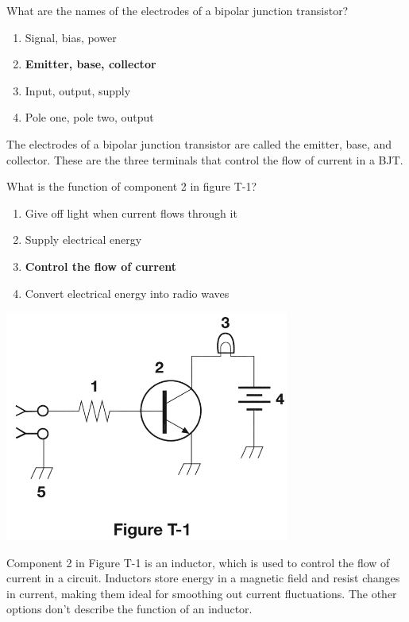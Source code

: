 \begin{tcolorbox}[colback=gray!10!white,colframe=black!75!black,title={T6B12}]
    What are the names of the electrodes of a bipolar junction transistor?
    \begin{enumerate}[label=\Alph*),noitemsep]
        \item Signal, bias, power
        \item \textbf{Emitter, base, collector}
        \item Input, output, supply
        \item Pole one, pole two, output
    \end{enumerate}
\end{tcolorbox}
The electrodes of a bipolar junction transistor are called the emitter, base, and collector. These are the three terminals that control the flow of current in a BJT.

\begin{tcolorbox}[
    colback=gray!10!white,
    colframe=black!75!black,
    title={T6D10},
    sidebyside,
    sidebyside align=top,
    lefthand width=0.45\textwidth
]
What is the function of component 2 in figure T-1?
\begin{enumerate}[label=\Alph*),noitemsep]
    \item Give off light when current flows through it
    \item Supply electrical energy
    \item \textbf{Control the flow of current}
    \item Convert electrical energy into radio waves
\end{enumerate}
\tcblower
\includegraphics[width=0.7\textwidth]{tech/images/t1.png}
\end{tcolorbox}
Component 2 in Figure T-1 is an inductor, which is used to control the flow of current in a circuit. Inductors store energy in a magnetic field and resist changes in current, making them ideal for smoothing out current fluctuations. The other options don’t describe the function of an inductor.
